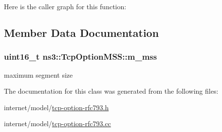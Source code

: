 Here is the caller graph for this function\+:




\subsection{Member Data Documentation}
\subsubsection[{\texorpdfstring{m\+\_\+mss}{m_mss}}]{\setlength{\rightskip}{0pt plus 5cm}uint16\+\_\+t ns3\+::\+Tcp\+Option\+M\+S\+S\+::m\+\_\+mss\hspace{0.3cm}{\ttfamily [protected]}}\hypertarget{classns3_1_1TcpOptionMSS_a247a7e4a1b78a1ffc5ab5a5d00645e88}{}\label{classns3_1_1TcpOptionMSS_a247a7e4a1b78a1ffc5ab5a5d00645e88}


maximum segment size 



The documentation for this class was generated from the following files\+:\begin{DoxyCompactItemize}
\item 
internet/model/\hyperlink{tcp-option-rfc793_8h}{tcp-\/option-\/rfc793.\+h}\item 
internet/model/\hyperlink{tcp-option-rfc793_8cc}{tcp-\/option-\/rfc793.\+cc}\end{DoxyCompactItemize}

